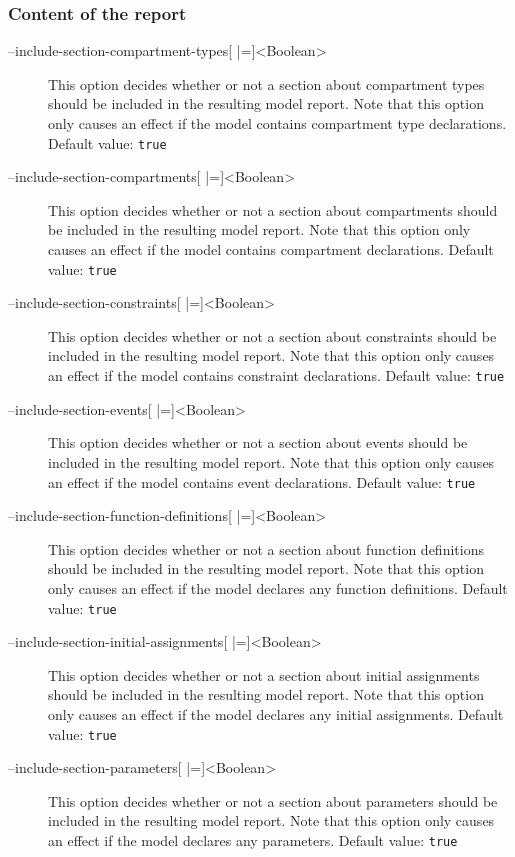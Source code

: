 \subsubsection{Content of the report}
\begin{description}
\item[--include-section-compartment-types{[} |={]}<Boolean>]
  This option decides whether or not a section about compartment
  types should be included in the resulting model report. Note
  that this option only causes an effect if the model contains
  compartment type declarations.
  Default value: \texttt{true}

\item[--include-section-compartments{[} |={]}<Boolean>]
  This option decides whether or not a section about compartments
  should be included in the resulting model report. Note that
  this option only causes an effect if the model contains compartment
  declarations.
  Default value: \texttt{true}

\item[--include-section-constraints{[} |={]}<Boolean>]
  This option decides whether or not a section about constraints
  should be included in the resulting model report. Note that
  this option only causes an effect if the model contains constraint
  declarations.
  Default value: \texttt{true}

\item[--include-section-events{[} |={]}<Boolean>]
  This option decides whether or not a section about events should
  be included in the resulting model report. Note that this option
  only causes an effect if the model contains event declarations.
  Default value: \texttt{true}

\item[--include-section-function-definitions{[} |={]}<Boolean>]
  This option decides whether or not a section about function definitions
  should be included in the resulting model report. Note that
  this option only causes an effect if the model declares any
  function definitions.
  Default value: \texttt{true}

\item[--include-section-initial-assignments{[} |={]}<Boolean>]
  This option decides whether or not a section about initial assignments
  should be included in the resulting model report. Note that
  this option only causes an effect if the model declares any
  initial assignments.
  Default value: \texttt{true}

\item[--include-section-parameters{[} |={]}<Boolean>]
  This option decides whether or not a section about parameters
  should be included in the resulting model report. Note that
  this option only causes an effect if the model declares any
  parameters.
  Default value: \texttt{true}


\end{description}
